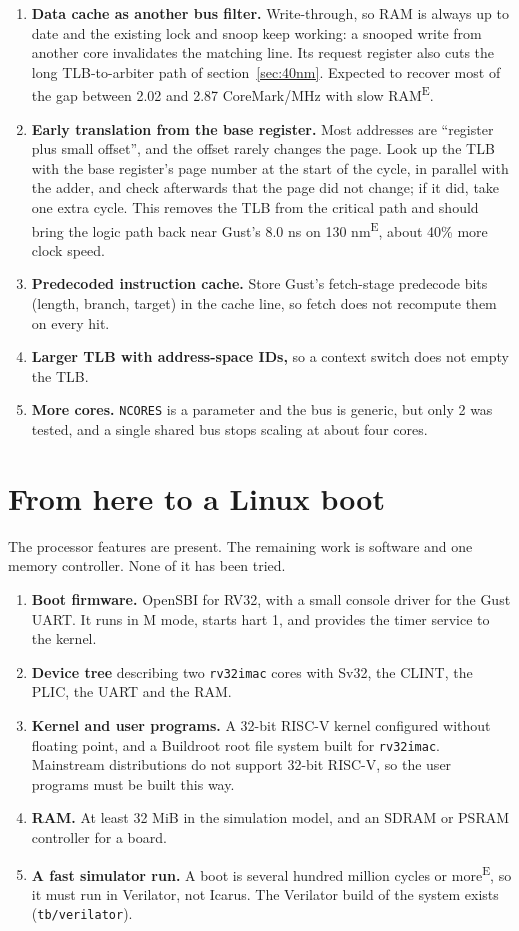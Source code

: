 \documentclass[10pt,a4paper]{article}
\newcommand{\code}[1]{\texttt{#1}}
\newcommand{\est}{\textsuperscript{E}}
\begin{document}
\begin{enumerate}
\item \textbf{Data cache as another bus filter.} Write-through, so RAM is always up to date and the
existing lock and snoop keep working: a snooped write from another core invalidates the matching line.
Its request register also cuts the long TLB-to-arbiter path of section~\ref{sec:40nm}.
Expected to recover most of the gap between 2.02 and 2.87 CoreMark/MHz with slow RAM\est.
\item \textbf{Early translation from the base register.} Most addresses are ``register plus small
offset'', and the offset rarely changes the page. Look up the TLB with the base register's page number
at the start of the cycle, in parallel with the adder, and check afterwards that the page did not change;
if it did, take one extra cycle. This removes the TLB from the critical path and should bring the logic
path back near Gust's 8.0 ns on 130 nm\est, about 40\% more clock speed.
\item \textbf{Predecoded instruction cache.} Store Gust's fetch-stage predecode bits (length, branch,
target) in the cache line, so fetch does not recompute them on every hit.
\item \textbf{Larger TLB with address-space IDs,} so a context switch does not empty the TLB.
\item \textbf{More cores.} \code{NCORES} is a parameter and the bus is generic, but only 2 was tested,
and a single shared bus stops scaling at about four cores.
\end{enumerate}

\section{From here to a Linux boot}\label{sec:linux}
The processor features are present. The remaining work is software and one memory controller. None
of it has been tried.

\begin{enumerate}
\item \textbf{Boot firmware.} OpenSBI for RV32, with a small console driver for the Gust UART. It runs in
M mode, starts hart 1, and provides the timer service to the kernel.
\item \textbf{Device tree} describing two \code{rv32imac} cores with Sv32, the CLINT, the PLIC, the UART
and the RAM.
\item \textbf{Kernel and user programs.} A 32-bit RISC-V kernel configured without floating point, and a
Buildroot root file system built for \code{rv32imac}. Mainstream distributions do not support 32-bit
RISC-V, so the user programs must be built this way.
\item \textbf{RAM.} At least 32 MiB in the simulation model, and an SDRAM or PSRAM controller for a board.
\item \textbf{A fast simulator run.} A boot is several hundred million cycles or more\est, so it must run
in Verilator, not Icarus. The Verilator build of the system exists (\code{tb/verilator}).
\end{enumerate}
\end{document}
